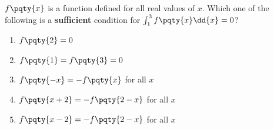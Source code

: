 \documentclass{article}
\begin{document}
\begin{example}[TMUA 2017 P2 Q10]
    \(f\pqty{x}\) is a function defined for all real values of \(x\). Which one of the following is a \textbf{sufficient} condition for \(\int_{1}^{3} f\pqty{x} \dd{x} = 0\)?
    
    \begin{enumerate}[label=\Alph*.]
        \item \(f\pqty{2} = 0\)
        \item \(f\pqty{1} = f\pqty{3} = 0\)
        \item \(f\pqty{-x} = - f \pqty{x}\) for all \(x\)
        \item \(f\pqty{x + 2} = - f \pqty{2 - x}\) for all \(x\)
        \item \(f\pqty{x - 2} = - f \pqty{2 - x}\) for all \(x\)
    \end{enumerate}
\end{example}
\end{document}

